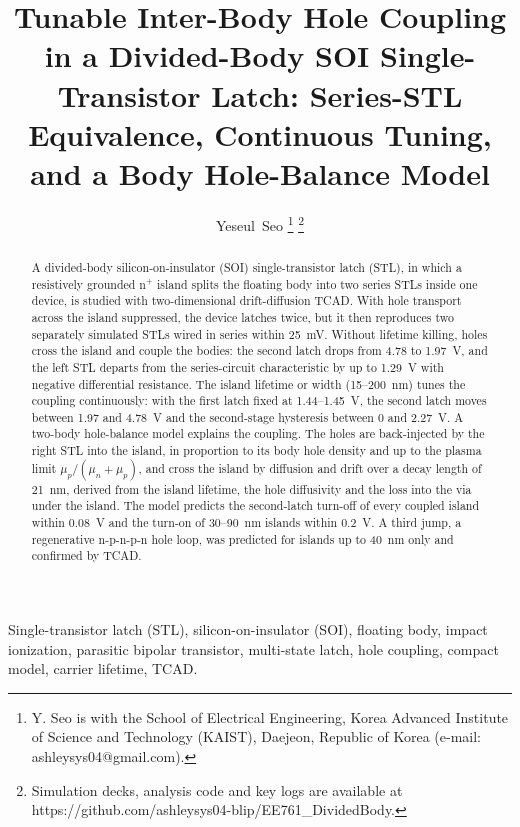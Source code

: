 \documentclass[journal]{IEEEtran}
\begin{document}
\title{Tunable Inter-Body Hole Coupling in a Divided-Body SOI Single-Transistor Latch: Series-STL Equivalence, Continuous Tuning, and a Body Hole-Balance Model}

\author{Yeseul~Seo%
\thanks{Y. Seo is with the School of Electrical Engineering, Korea Advanced Institute of Science and Technology (KAIST), Daejeon, Republic of Korea (e-mail: ashleysys04@gmail.com).}%
\thanks{Simulation decks, analysis code and key logs are available at https://github.com/ashleysys04-blip/EE761\_DividedBody.}}

\maketitle

\begin{abstract}
A divided-body silicon-on-insulator (SOI) single-transistor latch (STL), in which a resistively grounded n$^+$ island splits the floating body into two series STLs inside one device, is studied with two-dimensional drift-diffusion TCAD. With hole transport across the island suppressed, the device latches twice, but it then reproduces two separately simulated STLs wired in series within 25~mV. Without lifetime killing, holes cross the island and couple the bodies: the second latch drops from 4.78 to 1.97~V, and the left STL departs from the series-circuit characteristic by up to 1.29~V with negative differential resistance. The island lifetime or width (15--200~nm) tunes the coupling continuously: with the first latch fixed at 1.44--1.45~V, the second latch moves between 1.97 and 4.78~V and the second-stage hysteresis between 0 and 2.27~V. A two-body hole-balance model explains the coupling. The holes are back-injected by the right STL into the island, in proportion to its body hole density and up to the plasma limit $\mu_p/(\mu_n+\mu_p)$, and cross the island by diffusion and drift over a decay length of 21~nm, derived from the island lifetime, the hole diffusivity and the loss into the via under the island. The model predicts the second-latch turn-off of every coupled island within 0.08~V and the turn-on of 30--90~nm islands within 0.2~V. A third jump, a regenerative n-p-n-p-n hole loop, was predicted for islands up to 40~nm only and confirmed by TCAD.
\end{abstract}

\begin{IEEEkeywords}
Single-transistor latch (STL), silicon-on-insulator (SOI), floating body, impact ionization, parasitic bipolar transistor, multi-state latch, hole coupling, compact model, carrier lifetime, TCAD.
\end{IEEEkeywords}
\end{document}
